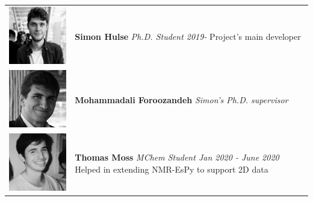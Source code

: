 \documentclass[letterpaper,10pt,english]{sphinxmanual}
\begin{document}
\begin{center}
\begin{tabular}{ m{2.2in} m{2.2in} }
\includegraphics[width=2in]{../media/contributors/SH.jpg} & \textbf{Simon Hulse} \newline \textit{Ph.D. Student 2019-} \newline Project's main developer \\
\includegraphics[width=2in]{../media/contributors/MF.jpg} & \textbf{Mohammadali Foroozandeh} \newline \textit{Simon's Ph.D. supervisor} \\
\includegraphics[width=2in]{../media/contributors/TM.png} & \textbf{Thomas Moss} \newline \textit{MChem Student Jan 2020 - June 2020} \newline Helped in extending NMR-EsPy to support 2D data \\
\end{tabular}
\end{center}
\end{document}
